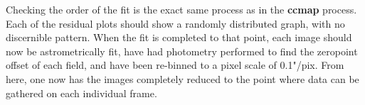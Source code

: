 \documentclass[a4paper]{article}
\begin{document}
Checking the order of the fit is the exact same process as in the \textbf{ccmap} process. Each of the residual plots should show a randomly distributed graph, with no discernible pattern.  When the fit is completed to that point, each image should now be astrometrically fit, have had photometry performed to find the zeropoint offset of each field, and have been re-binned to a pixel scale of 0.1"/pix.  From here, one now has the images completely reduced to the point where data can be gathered on each individual frame.
\end{document}
